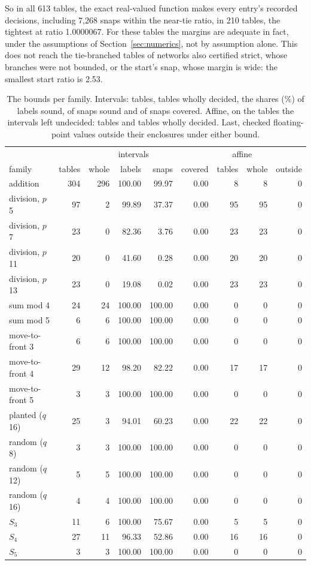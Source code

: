 \documentclass[11pt]{article}
\newcommand{\pn}[2]{#2}
\theoremstyle{definition}
\begin{document}
So in all \pn{bounds-decided}{613} tables, the exact real-valued function makes every entry's recorded
decisions, including \pn{bound-near-snaps}{7{,}268} snaps within the near-tie ratio, in
\pn{bound-near-tables}{210} tables, the tightest at ratio \pn{bound-smallest-ratio}{1.0000067}. For these
tables the margins are adequate in fact, under the assumptions of Section~\ref{sec:numerics}, not by
assumption alone. This does not reach the tie-branched tables of networks also certified strict, whose
branches were not bounded, or the start's snap, whose margin is wide: the smallest start ratio is
\pn{bound-start-ratio}{2.53}.

\begin{table}[t]
\centering
\caption{The bounds per family. Intervals: tables, tables wholly decided, the shares (\%) of labels
sound, of snaps sound and of snaps covered. Affine, on the tables the intervals left undecided: tables
and tables wholly decided. Last, checked floating-point values outside their enclosures under either bound.}
\label{tab:bound}
\begin{tabular}{lrrrrrrrr}
\toprule
 & \multicolumn{5}{c}{intervals} & \multicolumn{2}{c}{affine} & \\
family & tables & whole & labels & snaps & covered & tables & whole & outside \\
\midrule
addition & 304 & 296 & 100.00 & 99.97 & 0.00 & 8 & 8 & 0 \\
division, $p$ 5 & 97 & 2 & 99.89 & 37.37 & 0.00 & 95 & 95 & 0 \\
division, $p$ 7 & 23 & 0 & 82.36 & 3.76 & 0.00 & 23 & 23 & 0 \\
division, $p$ 11 & 20 & 0 & 41.60 & 0.28 & 0.00 & 20 & 20 & 0 \\
division, $p$ 13 & 23 & 0 & 19.08 & 0.02 & 0.00 & 23 & 23 & 0 \\
sum mod 4 & 24 & 24 & 100.00 & 100.00 & 0.00 & 0 & 0 & 0 \\
sum mod 5 & 6 & 6 & 100.00 & 100.00 & 0.00 & 0 & 0 & 0 \\
move-to-front 3 & 6 & 6 & 100.00 & 100.00 & 0.00 & 0 & 0 & 0 \\
move-to-front 4 & 29 & 12 & 98.20 & 82.22 & 0.00 & 17 & 17 & 0 \\
move-to-front 5 & 3 & 3 & 100.00 & 100.00 & 0.00 & 0 & 0 & 0 \\
planted ($q$ 16) & 25 & 3 & 94.01 & 60.23 & 0.00 & 22 & 22 & 0 \\
random ($q$ 8) & 3 & 3 & 100.00 & 100.00 & 0.00 & 0 & 0 & 0 \\
random ($q$ 12) & 5 & 5 & 100.00 & 100.00 & 0.00 & 0 & 0 & 0 \\
random ($q$ 16) & 4 & 4 & 100.00 & 100.00 & 0.00 & 0 & 0 & 0 \\
$S_3$ & 11 & 6 & 100.00 & 75.67 & 0.00 & 5 & 5 & 0 \\
$S_4$ & 27 & 11 & 96.33 & 52.86 & 0.00 & 16 & 16 & 0 \\
$S_5$ & 3 & 3 & 100.00 & 100.00 & 0.00 & 0 & 0 & 0 \\
\bottomrule
\end{tabular}
\end{table}
\end{document}
